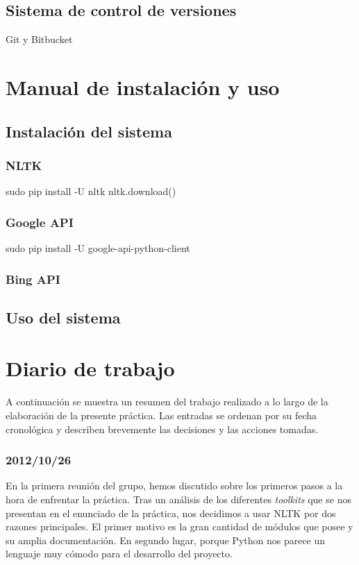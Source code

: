 \documentclass[12pt,a4paper,titlepage]{article}
\begin{document}
\subsection{Sistema de control de versiones}
Git y Bitbucket


\newpage
\section{Manual de instalación y uso}

\subsection{Instalación del sistema}

\subsubsection{NLTK}
sudo pip install -U nltk
nltk.download()

\subsubsection{Google API}
sudo pip install -U google-api-python-client

\subsubsection{Bing API}



\subsection{Uso del sistema}



\newpage
\section{Diario de trabajo}
A continuación se muestra un resumen del trabajo realizado a lo largo de la elaboración de la presente práctica. Las entradas se ordenan por su fecha cronológica y describen brevemente las decisiones y las acciones tomadas.


\subsubsection*{2012/10/26}
En la primera reunión del grupo, hemos discutido sobre los primeros pasos a la hora de enfrentar la práctica. Tras un análisis de los diferentes \emph{toolkits} que se nos presentan en el enunciado de la práctica, nos decidimos a usar NLTK por dos razones principales. El primer motivo es la gran cantidad de módulos que posee y su amplia documentación. En segundo lugar, porque Python nos parece un lenguaje muy cómodo para el desarrollo del proyecto.
\end{document}
